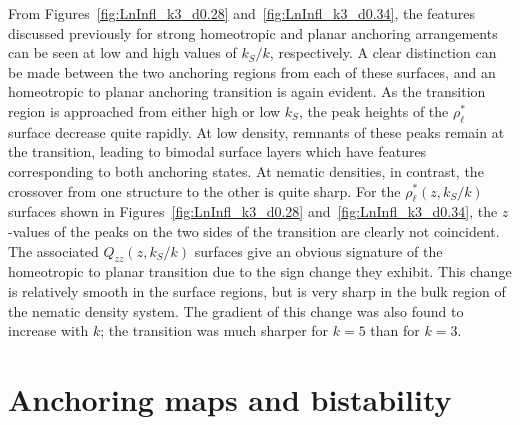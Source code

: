 \documentclass[aps,10pt,twocolumn]{revtex4}
\begin{document}
From Figures~\ref{fig:LnInfl_k3_d0.28} and~\ref{fig:LnInfl_k3_d0.34}, the features discussed previously for strong
homeotropic and planar anchoring arrangements can be seen at low and high values of $k_S/k$, respectively. A clear
distinction can be made between the two anchoring regions from each of these surfaces, and an homeotropic to
planar anchoring transition is again evident. As the transition region is approached from either high or low
$k_S$, the peak heights of the $\rho^{*}_\ell$ surface decrease quite rapidly. At low density, remnants of
these peaks remain at the transition, leading to bimodal surface layers which have features corresponding to both
anchoring states. At nematic densities, in contrast, the crossover from one structure to the other is quite sharp.
For the $\rho^{*}_\ell(z,k_S/k)$ surfaces shown in Figures~\ref{fig:LnInfl_k3_d0.28}
and~\ref{fig:LnInfl_k3_d0.34}, the $z$-values of the peaks on the two sides of the transition are clearly not
coincident. The associated $Q_{zz}(z,k_S/k)$ surfaces give an obvious signature of the homeotropic to planar
transition due to the sign change they exhibit. This change is relatively smooth in the surface regions, but is
very sharp in the bulk region of the nematic density system. The gradient of this change was also found to
increase with $k$; the transition was much sharper for $k=5$ than for $k=3$.

\section{Anchoring maps and bistability}
\label{s:anchoringPhaseDia}
\end{document}
